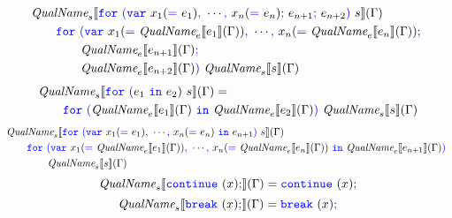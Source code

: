 \documentclass[a4paper]{article}
\newcommand{\code}[1]{\textcolor{blue}{\tt #1}}
\newcommand{\QualName}{\emph{QualName}}
\begin{document}
\begin{equation*}
\begin{split}
&\QualName_s \llbracket \code{for}\ \code{(var}\ x_1(\code{=}\ e_1)\code{,}\ \cdots\code{,}\ x_n(\code{=}\ e_n)\code{;}\ e_{n+1}\code{;}\ e_{n+2}\code{)}\ s \rrbracket (\Gamma) \\
&\qquad\code{for}\ \code{(var}\ x_1(\code{=}\ \QualName_e \llbracket e_1 \rrbracket (\Gamma))\code{,}\ \cdots\code{,}\ x_n(\code{=}\ \QualName_e \llbracket e_n \rrbracket (\Gamma))\code{;}\ \\
&\qquad\qquad\QualName_e \llbracket e_{n+1} \rrbracket (\Gamma)\code{;}\ \\
&\qquad\qquad\QualName_e \llbracket e_{n+2} \rrbracket (\Gamma)\code{)}\ \QualName_s \llbracket s \rrbracket (\Gamma)
\end{split}
\end{equation*}
\begin{equation*}
\begin{split}
&\QualName_s \llbracket \code{for}\ \code{(}e_1\ \code{in}\ e_2)\ s \rrbracket (\Gamma) = \\
&\qquad\code{for}\ \code{(}\QualName_e \llbracket e_1 \rrbracket (\Gamma)\ \code{in}\ \QualName_e \llbracket e_2 \rrbracket (\Gamma)\code{)}\ \QualName_s \llbracket s \rrbracket (\Gamma)
\end{split}
\end{equation*}
\begin{equation*}
\begin{split}
&\QualName_s \llbracket \code{for}\ \code{(var}\ x_1(\code{=}\ e_1)\code{,}\ \cdots\code{,}\ x_n(\code{=}\ e_n)\ \code{in}\ e_{n+1}\code{)}\ s \rrbracket (\Gamma) \\
&\qquad\code{for}\ \code{(var}\ x_1(\code{=}\ \QualName_e \llbracket e_1 \rrbracket (\Gamma))\code{,}\ \cdots\code{,}\ x_n(\code{=}\ \QualName_e \llbracket e_n \rrbracket (\Gamma))\ \code{in}\ \QualName_e \llbracket e_{n+1} \rrbracket (\Gamma)\code{)}\ \\
&\qquad\qquad\QualName_s \llbracket s \rrbracket (\Gamma)
\end{split}
\end{equation*}
\begin{equation*}
\QualName_s \llbracket \code{continue}\ (x)\code{;} \rrbracket (\Gamma) = \code{continue}\ (x)\code{;}
\end{equation*}
\begin{equation*}
\QualName_s \llbracket \code{break}\ (x)\code{;} \rrbracket (\Gamma) = \code{break}\ (x)\code{;}
\end{equation*}
\end{document}
